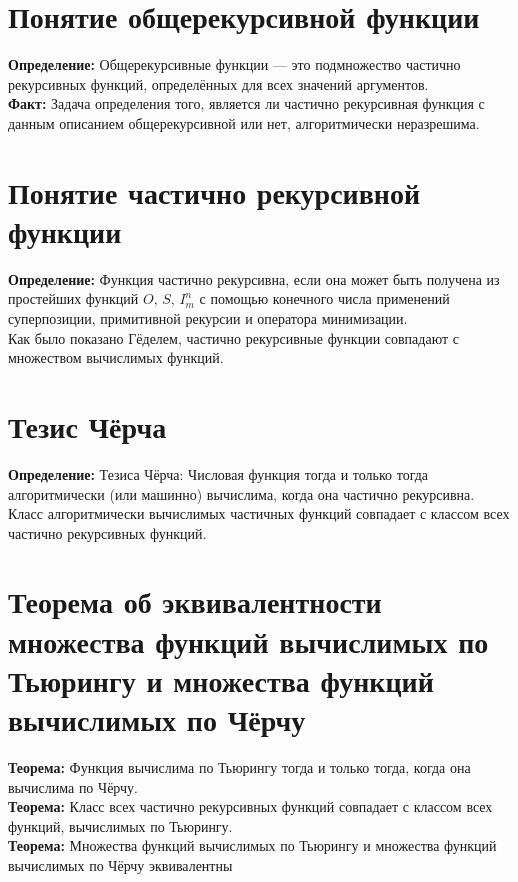 \documentclass[../main.tex]{subfiles}
\begin{document}
\section{Понятие общерекурсивной функции}
\textbf{Определение:
} Общерекурсивные функции — это подмножество частично рекурсивных функций, определённых для всех значений аргументов. \\
\textbf{Факт:
} Задача определения того, является ли частично рекурсивная функция с данным описанием общерекурсивной или нет, алгоритмически неразрешима.

\section{Понятие частично рекурсивной функции}
\textbf{Определение:
} Функция частично рекурсивна, если она может быть получена из простейших функций $O,\,S,\,I_m^n$ с помощью конечного числа применений суперпозиции, примитивной рекурсии и оператора минимизации. \\
Как было показано Гёделем, частично рекурсивные функции совпадают с множеством вычислимых функций.

\section{Тезис Чёрча}
\textbf{Определение:
} Тезиса Чёрча: Числовая функция тогда и только тогда алгоритмически (или машинно) вычислима, когда она частично рекурсивна. \\
Класс алгоритмически вычислимых частичных функций совпадает с классом всех частично рекурсивных функций.

\section{Теорема об эквивалентности множества функций вычислимых по Тьюрингу и множества функций вычислимых по Чёрчу}
\textbf{Теорема:
} Функция вычислима по Тьюрингу тогда и только тогда, когда она вычислима по Чёрчу. \\
\textbf{Теорема: 
} Класс всех частично рекурсивных функций совпадает с классом всех функций, вычислимых по Тьюрингу. \\
\textbf{Теорема:
} Множества функций вычислимых по Тьюрингу и множества функций вычислимых по Чёрчу эквивалентны
\end{document}
